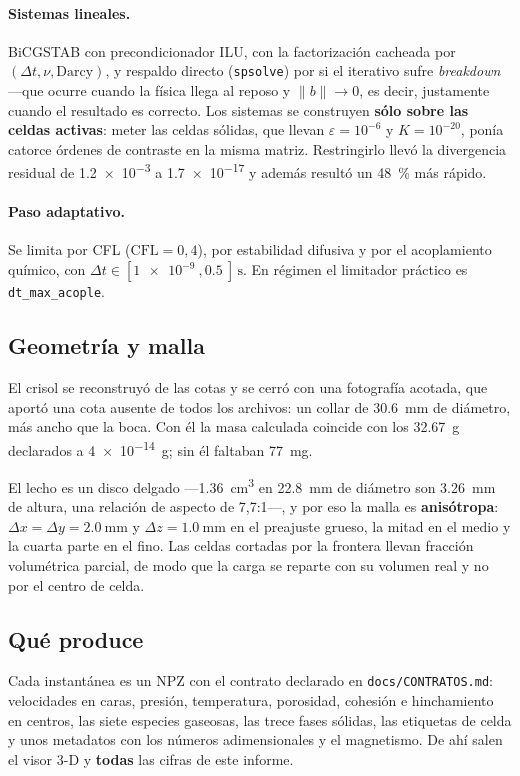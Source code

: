 \paragraph{Sistemas lineales.} BiCGSTAB con precondicionador ILU, con la
factorización cacheada por $(\Delta t, \nu, \text{Darcy})$, y respaldo directo
(\texttt{spsolve}) por si el iterativo sufre \emph{breakdown} ---que ocurre
cuando la física llega al reposo y $\|b\|\rightarrow 0$, es decir, justamente
cuando el resultado es correcto. Los sistemas se construyen \textbf{sólo sobre
las celdas activas}: meter las celdas sólidas, que llevan
$\varepsilon = 10^{-6}$ y $K = 10^{-20}$, ponía catorce órdenes de contraste en
la misma matriz. Restringirlo llevó la divergencia residual de \num{1.2e-3} a
\num{1.7e-17} y además resultó un \qty{48}{\percent} más rápido.

\paragraph{Paso adaptativo.} Se limita por CFL ($\mathrm{CFL} = 0{,}4$), por
estabilidad difusiva y por el acoplamiento químico, con
$\Delta t \in [\SI{1e-9}{}, \SI{0.5}{}]\,\si{\second}$. En régimen el limitador
práctico es \texttt{dt\_max\_acople}.

\subsection{Geometría y malla}

El crisol se reconstruyó de las cotas y se cerró con una fotografía acotada, que
aportó una cota ausente de todos los archivos: un collar de
\qty{30.6}{\milli\meter} de diámetro, más ancho que la boca. Con él la masa
calculada coincide con los \qty{32.67}{\gram} declarados a
\SI{4e-14}{\gram}; sin él faltaban \qty{77}{\milli\gram}.

El lecho es un disco delgado ---\qty{1.36}{\centi\meter\cubed} en
\qty{22.8}{\milli\meter} de diámetro son \qty{3.26}{\milli\meter} de altura, una
relación de aspecto de 7,7:1---, y por eso la malla es \textbf{anisótropa}:
$\Delta x = \Delta y = \SI{2.0}{\milli\meter}$ y $\Delta z =
\SI{1.0}{\milli\meter}$ en el preajuste grueso, la mitad en el medio y la cuarta
parte en el fino. Las celdas cortadas por la frontera llevan fracción
volumétrica parcial, de modo que la carga se reparte con su volumen real y no
por el centro de celda.

\subsection{Qué produce}

Cada instantánea es un NPZ con el contrato declarado en
\texttt{docs/CONTRATOS.md}: velocidades en caras, presión, temperatura,
porosidad, cohesión e hinchamiento en centros, las siete especies gaseosas, las
trece fases sólidas, las etiquetas de celda y unos metadatos con los números
adimensionales y el magnetismo. De ahí salen el visor 3-D y \textbf{todas} las
cifras de este informe.
